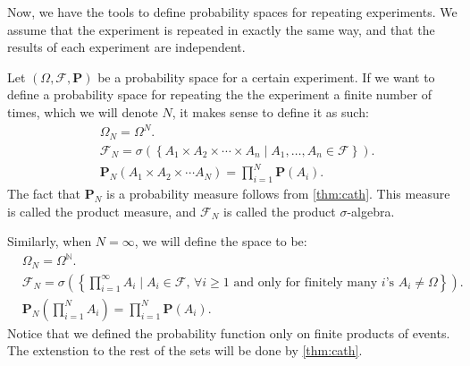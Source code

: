 \documentclass[11pt,a4paper]{article}
\theoremstyle{definition}
\theoremstyle{plain}
\newcommand{\N}{\mathbb{N}}
\newcommand{\set}[2]{ \left\{ #1 \mid #2 \right\} }
\begin{document}
  Now, we have the tools to define probability spaces for repeating experiments.
  We assume that the experiment is repeated in exactly the same way, and that
  the results of each experiment are independent.

  Let $(\Omega, \mathcal F, \mathbf P)$ be a probability space for a certain
  experiment. If we want to define a probability space for repeating the
  the experiment a finite number of times, which we will denote $N$, it makes
  sense to define it as such:
  \begin{align*}
    &\Omega_N = \Omega^N. \\
    &\mathcal F_N = \sigma\left(\set{A_1 \times A_2 \times \cdots \times A_n}
    {A_1,\dots,A_n \in \mathcal F}\right). \\
    &\mathbf P_N\left(A_1 \times A_2 \times \cdots A_N\right) = 
    \prod_{i=1}^{N} \mathbf P(A_i).
  \end{align*}
  The fact that $\mathbf P_N$ is a probability measure follows from 
  \autoref{thm:cath}. This measure is called the product measure, and 
  $\mathcal F_N$ is called the product $\sigma$-algebra.

  Similarly, when $N=\infty$, we will define the space to be:
  \begin{align*}
    &\Omega_N = \Omega^{\N}. \\
    &\mathcal F_N = \sigma\left(\set{\prod_{i=1}^{\infty}{A_i}}
    {A_i \in \mathcal F, \, \forall i \geq 1 \text{ and only for finitely many
    $i$'s } A_i \neq \Omega}\right). \\
    &\mathbf P_N\left(\prod_{i=1}^{N}{A_i}\right) = 
    \prod_{i=1}^{N} \mathbf P(A_i).
  \end{align*}
  Notice that we defined the probability function only on finite products of
  events. The extenstion to the rest of the sets will be done by 
  \autoref{thm:cath}.
\end{document}
